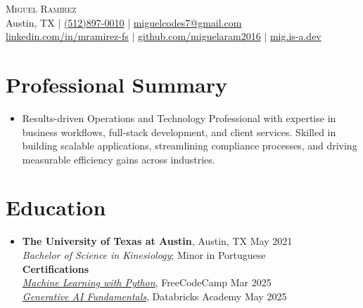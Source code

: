 \documentclass[letterpaper,10pt]{article}
\begin{document}
\begin{center}
  {\Large \scshape Miguel Ramirez} \\ \vspace{0pt}
  Austin, TX | \href{tel:+15128970010}{(512)897-0010} | \href{mailto:miguelcodes7@gmail.com}{miguelcodes7@gmail.com} \\ 
  \href{https://linkedin.com/in/mramirez-fs}{linkedin.com/in/mramirez-fs} $|$
  \href{https://github.com/miguelaram2016}{github.com/miguelaram2016} $|$
  \href{https://mig.is-a.dev}{mig.is-a.dev}
\end{center}

\section*{Professional Summary}
\begin{itemize}
  \item[]
    Results-driven Operations and Technology Professional with expertise in business workflows, full-stack development, and client services. Skilled in building scalable applications, streamlining compliance processes, and driving measurable efficiency gains across industries.
\end{itemize}

\section*{Education}
\begin{itemize}
  \item[]
    \textbf{The University of Texas at Austin}, Austin, TX \hfill May 2021 \\
    \textit{Bachelor of Science in Kinesiology}; Minor in Portuguese \vspace{3pt} \\ 
    \textbf{Certifications} \\
    \textit{\href{https://www.freecodecamp.org/certification/migglenero/machine-learning-with-python-v7}{Machine Learning with Python}}, FreeCodeCamp \hfill Mar 2025 \\
    \textit{\href{https://credentials.databricks.com/052cc354-c947-42d8-81bb-40c38d77ace3\#acc.B2op0GxP}{Generative AI Fundamentals}}, Databricks Academy \hfill May 2025
\end{itemize}

\end{document}

